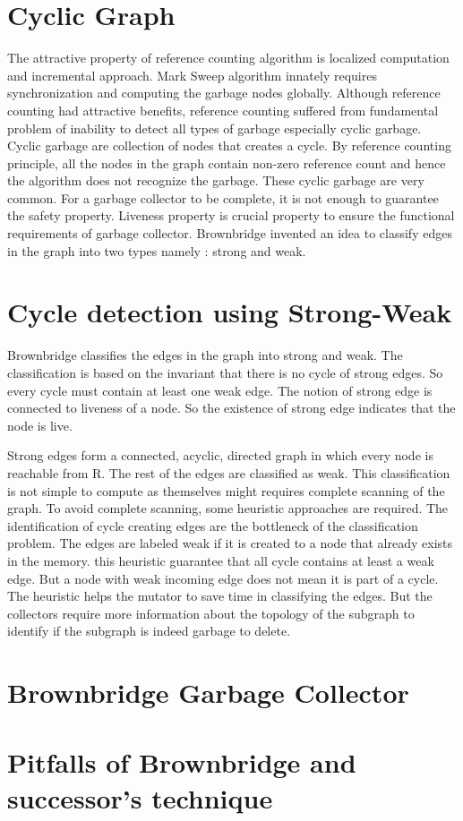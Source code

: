 \section{Cyclic Graph}
The attractive property of reference counting algorithm is localized computation and incremental approach. Mark Sweep algorithm innately requires synchronization and computing the garbage nodes globally. Although reference counting had attractive benefits, reference counting  suffered from fundamental problem of inability to detect all types of garbage especially cyclic garbage. Cyclic garbage are collection of nodes that creates a cycle. By reference counting principle, all the nodes in the graph contain non-zero reference count and hence the algorithm does not recognize the garbage. These cyclic garbage are very common. For a garbage collector to be complete, it is not enough to guarantee the safety property. Liveness property is crucial property to ensure the functional requirements of garbage collector. Brownbridge invented an idea to classify edges in the graph into two types namely : strong and weak. 
\section{Cycle detection using Strong-Weak}
Brownbridge classifies the edges in the graph into strong and weak. The classification is based on the invariant that there is no cycle of strong edges. So every cycle must contain at least one weak edge. The notion of strong edge is connected to liveness of a node. So  the existence of strong edge indicates that the node is live. 

Strong edges form a connected, acyclic, directed graph in which every node is reachable from R. The rest of the edges are classified as weak. This classification is not simple to compute as themselves might requires complete scanning of the graph. To avoid complete scanning, some heuristic approaches are required. The identification of cycle creating edges are the bottleneck of the classification problem. The edges are  labeled weak if it is created to a node that already exists in the memory. this heuristic guarantee that all cycle contains at least a weak edge. But a node with weak incoming edge does not mean it is part of a cycle. The heuristic helps the mutator to save time in classifying the edges. But the collectors require more information about the topology of the subgraph to identify if the subgraph is indeed garbage to delete.
\section{Brownbridge Garbage Collector}
\section{Pitfalls of Brownbridge and successor's technique}
